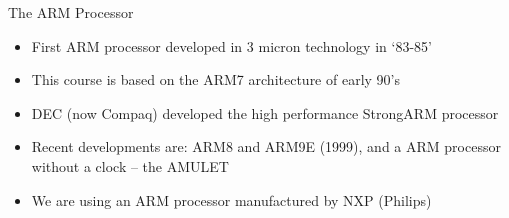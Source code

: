 \documentclass[svgnames,x11names]{beamer}
\begin{document}
\begin{frame}{The ARM Processor}
  \begin{itemize}
  \item First ARM processor developed in 3 micron technology in
    `83-85'
  \item This course is based on the ARM7 architecture of early 90's
  \item DEC (now Compaq) developed the high performance StrongARM
    processor
  \item Recent developments are: ARM8 and ARM9E (1999), and a ARM
    processor without a clock -- the AMULET
  \item We are using an ARM processor manufactured by NXP (Philips)
  \end{itemize}
\end{frame}
\end{document}
